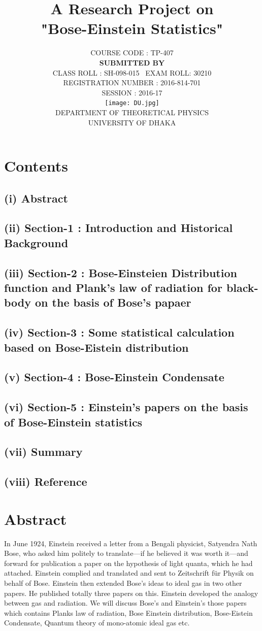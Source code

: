 \documentclass[12pt, letterpaper]{article}
\title{\color{blue}A Research Project on \\ "Bose-Einstein Statistics"}
\author{ COURSE CODE : TP-407 \\ \textbf{SUBMITTED BY}
 \\  CLASS ROLL : SH-098-015 \  EXAM ROLL: 30210 \\
 REGISTRATION NUMBER : 2016-814-701 \\     SESSION : 2016-17
\\ 
\texttt{[image: DU.jpg]} \\  DEPARTMENT OF THEORETICAL PHYSICS \\ UNIVERSITY OF DHAKA 
}
\begin{document}
    \maketitle
    \section*{Contents}
    \subsection*{(i) Abstract}
    \subsection*{(ii) Section-1 : Introduction and Historical Background}
    \subsection*{(iii) Section-2 : Bose-Einsteien Distribution function and Plank's law of radiation for black-body on the basis of Bose's papaer}
    \subsection*{(iv) Section-3 : Some statistical calculation based on Bose-Eistein distribution}
    \subsection*{(v) Section-4 : Bose-Einstein Condensate}
    \subsection*{(vi) Section-5 : Einstein's papers on the basis of Bose-Einstein statistics}
    \subsection*{(vii) Summary}
    \subsection*{(viii) Reference}
    \newpage
    \section*{Abstract}
        In June 1924, Einstein received a letter from a Bengali physicist,
        Satyendra Nath Bose, who asked him politely to translate—if he believed it
        was worth it—and forward for publication a paper on the hypothesis of light
        quanta, which he had attached. Einstein complied and translated and sent
        to Zeitschrift für Physik on behalf of Bose. Einstein then extended Bose's ideas to ideal gas in two other papers.
        He published totally three papers on this. Einstein developed the analogy between gas and radiation.
        We will discuss Bose's and Einstein's those papers which contains Planks law of radiation, Bose Einstein
        distribution, Bose-Eistein Condensate, Quantum theory of mono-atomic ideal gas etc. 
        \newpage
\end{document}
